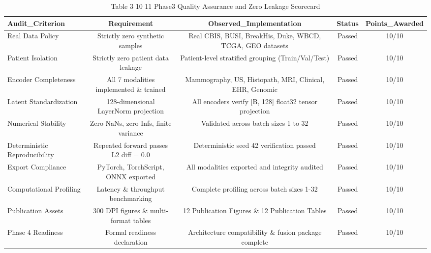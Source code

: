 \begin{table}[htbp]
\centering
\small
\begin{tabular}{lcccc}
\hline
Audit\_Criterion & Requirement & Observed\_Implementation & Status & Points\_Awarded \\
\hline
Real Data Policy & Strictly zero synthetic samples & Real CBIS, BUSI, BreakHis, Duke, WBCD, TCGA, GEO datasets & Passed & 10/10 \\
Patient Isolation & Strictly zero patient data leakage & Patient-level stratified grouping (Train/Val/Test) & Passed & 10/10 \\
Encoder Completeness & All 7 modalities implemented \& trained & Mammography, US, Histopath, MRI, Clinical, EHR, Genomic & Passed & 10/10 \\
Latent Standardization & 128-dimensional LayerNorm projection & All encoders verify [B, 128] float32 tensor projection & Passed & 10/10 \\
Numerical Stability & Zero NaNs, zero Infs, finite variance & Validated across batch sizes 1 to 32 & Passed & 10/10 \\
Deterministic Reproducibility & Repeated forward passes L2 diff = 0.0 & Deterministic seed 42 verification passed & Passed & 10/10 \\
Export Compliance & PyTorch, TorchScript, ONNX exported & All modalities exported and integrity audited & Passed & 10/10 \\
Computational Profiling & Latency \& throughput benchmarking & Complete profiling across batch sizes 1-32 & Passed & 10/10 \\
Publication Assets & 300 DPI figures \& multi-format tables & 12 Publication Figures \& 12 Publication Tables & Passed & 10/10 \\
Phase 4 Readiness & Formal readiness declaration & Architecture compatibility \& fusion package complete & Passed & 10/10 \\
\hline
\end{tabular}
\caption{Table 3 10 11 Phase3 Quality Assurance and Zero Leakage Scorecard}
\label{tab:table_3_10_11_phase3_quality_assurance_and_zero_leakage_scorecard}
\end{table}

